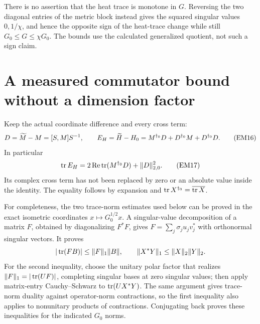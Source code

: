 \documentclass[11pt]{article}
\begin{document}
There is no assertion that the heat trace is monotone in \(G\). Reversing
the two diagonal entries of the metric block instead gives the squared
singular values \(0,1/\chi\), and hence the opposite sign of the
heat-trace change while still \(G_0\le G\le\chi G_0\).
The bounds use the calculated generalized quotient, not such a sign claim.

\section{A measured commutator bound without a dimension factor}

Keep the actual coordinate difference and every cross term:
\begin{equation}
 D=\widetilde M-M=[S,M]S^{-1},\qquad
 E_H=\widetilde H-H_0=M^{\dagger_0}D+D^{\dagger_0}M+D^{\dagger_0}D.
 \tag{EM16}\label{hem:EM16}
\end{equation}
In particular
\begin{equation}
 \operatorname{tr} E_H=2\operatorname{Re}\operatorname{tr}(M^{\dagger_0}D)+\|D\|_{2,0}^2.
 \tag{EM17}\label{hem:EM17}
\end{equation}
Its complex cross term has not been replaced by zero or an absolute value
inside the identity. The equality follows by expansion and
\(\operatorname{tr} X^{\dagger_0}=\overline{\operatorname{tr} X}\).

For completeness, the two trace-norm estimates used below can be proved
in the exact isometric coordinates \(x\mapsto G_0^{1/2}x\). A singular-value
decomposition of a matrix \(F\), obtained by diagonalizing \(F^*F\),
gives \(F=\sum_j\sigma_j u_jv_j^*\) with orthonormal singular vectors.
It proves
\[
 |\operatorname{tr}(FB)|\le\|F\|_1\|B\|,\qquad
 \|X^*Y\|_1\le\|X\|_2\|Y\|_2.
\]
For the second inequality, choose the unitary polar factor that realizes
\(\|F\|_1=|\operatorname{tr}(UF)|\), completing singular bases at zero singular values;
then apply matrix-entry Cauchy--Schwarz to
\(\operatorname{tr}(UX^*Y)\). The same argument gives trace-norm duality against
operator-norm contractions, so the first inequality also applies to
nonunitary products of contractions. Conjugating back proves these
inequalities for the indicated \(G_0\) norms.
\end{document}
